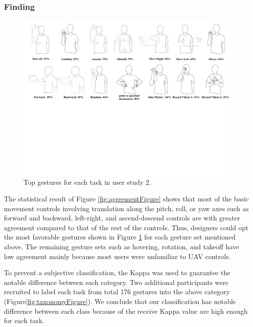 \documentclass{sigchi}
\begin{document}
\subsubsection{Finding}
\begin{figure}
  \centering
  \includegraphics[width=1\textwidth]{GestureSetFigure1.pdf}
  \caption{Top gestures for each task in user study 2.}
  \label{fig:GestureSetFigure}
  \end{figure}
The statistical result of Figure \ref{fig:agreementFigure} shows that most of the basic movement controls involving translation along the pitch, roll, or yaw axes such as forward and backward, left-right, and ascend-descend controls are with greater agreement compared to that of the rest of the controls. Thus, designers could opt the most favorable gestures shown in Figure \ref{fig:GestureSetFigure} for each gesture set mentioned above. The remaining gesture sets such as hovering, rotation, and takeoff have low agreement mainly because most users were unfamiliar to UAV controls.

To prevent a subjective classification, the Kappa was used to guarantee the notable difference between each category. Two additional participants were recruited to label each task from total 176 gestures into the above category (Figure\ref{fig:taxonomyFigure}). We conclude that our classification has notable difference between each class because of the receive Kappa value are high enough for each task.



\end{document}
